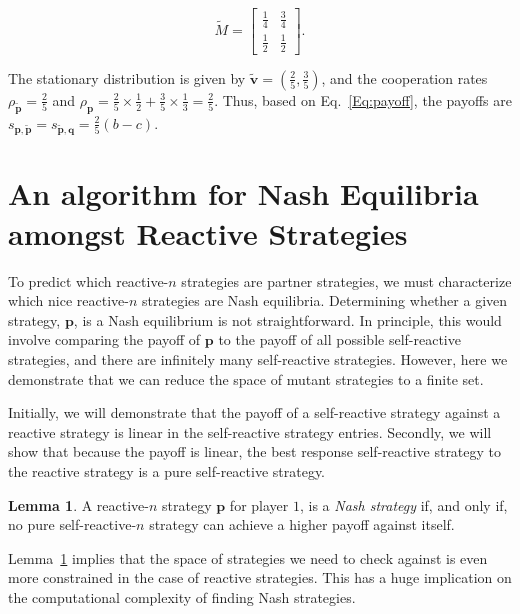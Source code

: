 \documentclass{article}
\theoremstyle{definition}
\newtheorem{lemma}[theorem]{Lemma}
\begin{document}
$$
\tilde{M} = 
\begin{bmatrix}
  \frac{1}{4} & \frac{3}{4}\\[6pt]
  \frac{1}{2} & \frac{1}{2}
\end{bmatrix}.
$$

The stationary distribution is given by $\mathbf{\tilde{v}} = (\frac{2}{5},
\frac{3}{5})$, and the cooperation rates $\rho_\mathbf{\tilde{p}} = \frac{2}{5}$
and $\rho_\mathbf{p} = \frac{2}{5} \times \frac{1}{2} + \frac{3}{5} \times
\frac{1}{3} = \frac{2}{5}$. Thus, based on Eq.~\eqref{Eq:payoff}, the payoffs are
$s_{\mathbf{p}, \mathbf{\tilde{p}}} = s_{\mathbf{\tilde{p}}, \mathbf{q}} =
\frac{2}{5}(b -c)$.


\section{An algorithm for Nash Equilibria amongst Reactive Strategies}\label{section:reactive_nash_strategies}

To predict which reactive-$n$ strategies are partner strategies, we must
characterize which nice reactive-$n$ strategies are Nash equilibria. Determining
whether a given strategy, $\mathbf{p}$, is a Nash equilibrium is not
straightforward. In principle, this would involve comparing the payoff of
$\mathbf{p}$ to the payoff of all possible self-reactive strategies, and there
are infinitely many self-reactive strategies. However, here we demonstrate that
we can reduce the space of mutant strategies to a finite set.

Initially, we will demonstrate that the payoff of a self-reactive strategy
against a reactive strategy is linear in the self-reactive strategy entries.
Secondly, we will show that because the payoff is linear, the best response
self-reactive strategy to the reactive strategy is a pure self-reactive
strategy.

\begin{lemma}\label{lemma:nash_against_pure_self_reactive} 
A reactive-$n$ strategy $\mathbf{p}$ for player $1$, is a \textit{Nash strategy}
if, and only if, no pure self-reactive-$n$ strategy can achieve a higher payoff
against itself.
\end{lemma}

Lemma~\ref{lemma:nash_against_pure_self_reactive} implies that the space of
strategies we need to check against is even more constrained in the case of
reactive strategies. This has a huge implication on the computational complexity
of finding Nash strategies.
\end{document}
